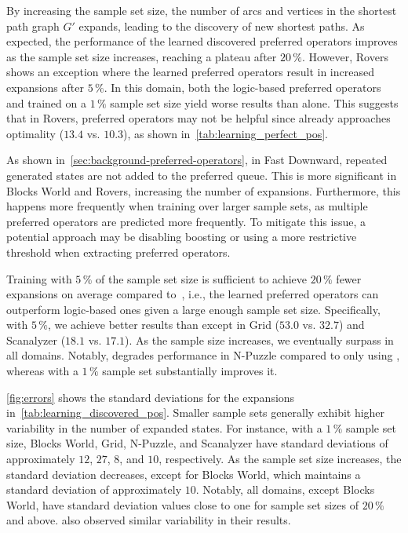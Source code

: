 \documentclass[ppgc,diss,english]{iiufrgs}
\begin{document}


By increasing the sample set size, the number of arcs and vertices in the shortest path graph $G'$ expands, leading to the discovery of new shortest paths. As expected, the performance of the learned discovered preferred operators \pog improves as the sample set size increases, reaching a plateau after $20\,\%$. However, Rovers shows an exception where the learned preferred operators result in increased expansions after $5\,\%$. In this domain, both the logic-based preferred operators \poff and \pog trained on a $1\,\%$ sample set size yield worse results than \hnn alone. This suggests that in Rovers, preferred operators may not be helpful since \hnn already approaches optimality ($13.4$ vs. $10.3$), as shown in~\cref{tab:learning_perfect_pos}.

As shown in~\cref{sec:background-preferred-operators}, in Fast Downward, repeated generated states are not added to the preferred queue. This is more significant in Blocks World and Rovers, increasing the number of expansions. Furthermore, this happens more frequently when training over larger sample sets, as multiple preferred operators are predicted more frequently. To mitigate this issue, a potential approach may be disabling boosting or using a more restrictive threshold when extracting preferred operators.

Training with $5\,\%$ of the sample set size is sufficient to achieve $20\,\%$ fewer expansions on average compared to~\poff, i.e., the learned preferred operators \pog can outperform logic-based ones given a large enough sample set size. Specifically, with $5\,\%$, we achieve better results than \poff except in Grid ($53.0$ vs. $32.7$) and Scanalyzer ($18.1$ vs. $17.1$). As the sample size increases, we eventually surpass \poff in all domains. Notably, \poff degrades performance in N-Puzzle compared to only using \hnn, whereas \pog with a $1\,\%$ sample set substantially improves it.

\cref{fig:errors} shows the standard deviations for the expansions in~\cref{tab:learning_discovered_pos}. Smaller sample sets generally exhibit higher variability in the number of expanded states. For instance, with a $1\,\%$ sample set size, Blocks World, Grid, N-Puzzle, and Scanalyzer have standard deviations of approximately $12$, $27$, $8$, and $10$, respectively. As the sample set size increases, the standard deviation decreases, except for Blocks World, which maintains a standard deviation of approximately $10$. Notably, all domains, except Blocks World, have standard deviation values close to one for sample set sizes of $20\,\%$ and above. \citet{Bettker.etal/2022} also observed similar variability in their results.
\end{document}
